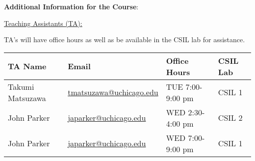 \noindent \textbf {\Large \sc Additional Information for the Course}:

\vspace{1cm}

\noindent \underline{Teaching Assistants (TA):}

\noindent TA's will have office hours as well as be available in the CSIL lab for assistance.

\vspace{1cm}

\begin{tabular}{l l | l | l }

TA Name & Email & Office Hours & CSIL Lab \\ \hline

Takumi Matsuzawa & \href{mailto:tmatsuzawa@uchicago.edu}{tmatsuzawa@uchicago.edu}  & TUE  7:00-9:00 pm  & CSIL 1 \\
John Parker      & \href{mailto:japarker@uchicago.edu}{japarker@uchicago.edu}      & WED  2:30-4:00 pm  & CSIL 2 \\
John Parker      & \href{mailto:japarker@uchicago.edu}{japarker@uchicago.edu}      & WED  7:00-9:00 pm  & CSIL 1 \\


\end{tabular}

\vspace{1cm}

